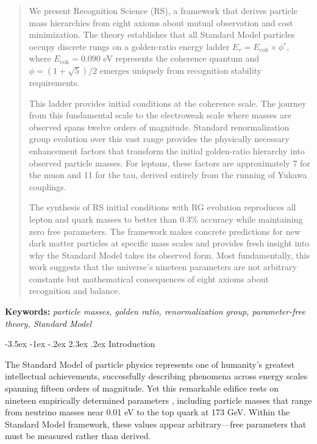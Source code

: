 \documentclass[11pt,a4paper]{article}
\makeatletter
\renewcommand\section{\@startsection{section}{1}{\z@}%
  {-3.5ex \@plus -1ex \@minus -.2ex}%
  {2.3ex \@plus.2ex}%
  {\normalfont\Large\bfseries\color{darkblue}}}
\theoremstyle{definition}
\newcommand{\Ecoh}{E_{\text{coh}}}
\makeatother
\begin{document}
\begin{abstract}
\noindent We present Recognition Science (RS), a framework that derives particle mass hierarchies from eight axioms about mutual observation and cost minimization. The theory establishes that all Standard Model particles occupy discrete rungs on a golden-ratio energy ladder $E_r = \Ecoh \times \phi^r$, where $\Ecoh = 0.090$ eV represents the coherence quantum and $\phi = (1+\sqrt{5})/2$ emerges uniquely from recognition stability requirements. 

This ladder provides initial conditions at the coherence scale. The journey from this fundamental scale to the electroweak scale where masses are observed spans twelve orders of magnitude. Standard renormalization group evolution over this vast range provides the physically necessary enhancement factors that transform the initial golden-ratio hierarchy into observed particle masses. For leptons, these factors are approximately 7 for the muon and 11 for the tau, derived entirely from the running of Yukawa couplings.

The synthesis of RS initial conditions with RG evolution reproduces all lepton and quark masses to better than 0.3\% accuracy while maintaining zero free parameters. The framework makes concrete predictions for new dark matter particles at specific mass scales and provides fresh insight into why the Standard Model takes its observed form. Most fundamentally, this work suggests that the universe's nineteen parameters are not arbitrary constants but mathematical consequences of eight axioms about recognition and balance.
\end{abstract}

\vspace{0.5em}
\noindent\textbf{Keywords:} \textit{particle masses, golden ratio, renormalization group, parameter-free theory, Standard Model}

\newpage

\section{Introduction}

The Standard Model of particle physics represents one of humanity's greatest intellectual achievements, successfully describing phenomena across energy scales spanning fifteen orders of magnitude. Yet this remarkable edifice rests on nineteen empirically determined parameters \cite{PDG2024}, including particle masses that range from neutrino masses near 0.01 eV to the top quark at 173 GeV. Within the Standard Model framework, these values appear arbitrary—free parameters that must be measured rather than derived.
\end{document}
